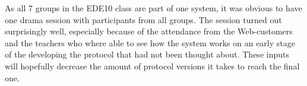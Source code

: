 As all 7 groups in the EDE10 class are part of one system, it was obvious to have one drama session with participants from all groups. The session turned out surprisingly well, especially because of the attendance from the Web-customers and the teachers who where able to see how the system works on an early stage of the developing the protocol that had not been thought about. These inputs will hopefully decrease the amount of protocol versions it takes to reach the final one.

